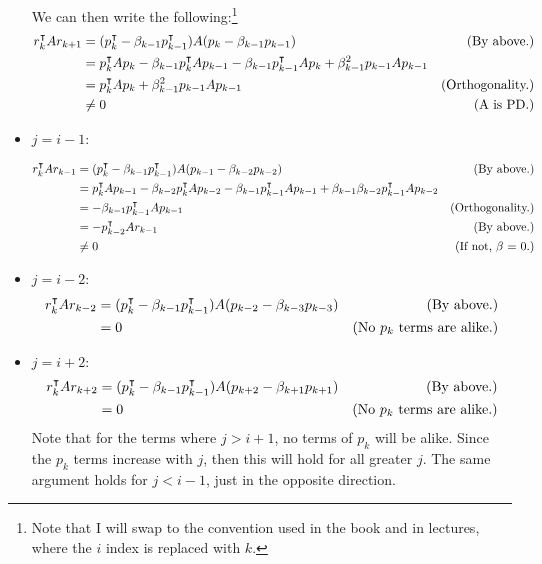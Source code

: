 \begin{solution}
\begin{itemize}
        We can then write the following:\footnote{Note that I will swap to the convention used in the book and in lectures, where the $i$ index is replaced with $k$.}
        \tightalignbreak
        \begin{align*}
            r_k^\intercal Ar_{k+1} &= (p_k^\intercal - \beta_{k-1}p_{k-1}^\intercal)A(p_{k} - \beta_{k-1}p_{k-1}) &\text{(By above.)}\\
            &= p_k^\intercal Ap_k -\beta_{k-1}p_k^\intercal Ap_{k-1} -\beta_{k-1}p_{k-1}^\intercal Ap_k + \beta_{k-1}^2 p_{k-1}Ap_{k-1}\\
            &= p_k^\intercal Ap_k +\beta_{k-1}^2 p_{k-1}Ap_{k-1} &\text{(Orthogonality.)}\\
            &\neq 0 &\text{(A is PD.)}
        \end{align*}
        \vspace{-12mm}\alignbreak

        \item \underline{$j = i-1$}:

        \tightalignbreak
        \begin{align*}
            r_k^\intercal Ar_{k-1} &= (p_k^\intercal - \beta_{k-1}p_{k-1}^\intercal)A(p_{k-1} - \beta_{k-2}p_{k-2}) &\text{(By above.)}\\
            &= p_k^\intercal Ap_{k-1} - \beta_{k-2}p_k^\intercal Ap_{k-2} - \beta_{k-1}p_{k-1}^\intercal Ap_{k-1} + \beta_{k-1}\beta_{k-2}p_{k-1}^\intercal Ap_{k-2}\\
            &= -\beta_{k-1}p_{k-1}^\intercal Ap_{k-1} &\text{(Orthogonality.)}\\
            &= -p_{k-2}^\intercal Ar_{k-1} &\text{(By above.)}\\
            &\neq 0 &\text{(If not, $\beta$ = 0.)}
        \end{align*} 
        \vspace{-12mm}\alignbreak

        \item \underline{$j = i-2$}:
        \tightalignbreak
        \begin{align*}
            r_k^\intercal Ar_{k-2} &= (p_k^\intercal - \beta_{k-1}p_{k-1}^\intercal) A(p_{k-2} - \beta_{k-3}p_{k-3}) &\text{(By above.)}\\
            &= 0 &\text{(No $p_k$ terms are alike.)}
        \end{align*}
        \vspace{-12mm}\alignbreak

        \item \underline{$j = i+2$}:
        \tightalignbreak
        \begin{align*}
            r_k^\intercal Ar_{k+2} &= (p_k^\intercal - \beta_{k-1}p_{k-1}^\intercal) A(p_{k+2} - \beta_{k+1}p_{k+1}) &\text{(By above.)}\\
            &= 0 &\text{(No $p_k$ terms are alike.)}
        \end{align*}
        \vspace{-12mm}\alignbreak
        Note that for the terms where $j > i+1$, no terms of $p_k$ will be alike. Since the $p_k$ terms increase with $j$, then this will hold for all greater $j$. The same argument holds for $j < i-1$, just in the opposite direction.

    \end{itemize}
\end{solution}
\newpage
